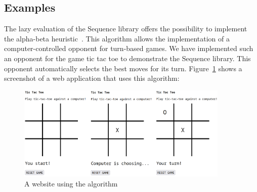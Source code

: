 \subsection*{Examples} %
\label{sub:introduction_Examples}
The lazy evaluation of the Sequence library offers the possibility to implement
the alpha-beta heuristic~\cite[Ch. 5]{hughes_why_1989}. 
This algorithm allows the implementation of a computer-controlled opponent for
turn-based games. We have implemented such an opponent for the game tic tac toe
to demonstrate the Sequence library. This opponent automatically selects the
best moves for its turn. Figure~\ref{img:intro_ttt_playfield} shows a screenshot of a web
application that uses this algorithm:
\begin{figure}[H]
    \centering
    \includegraphics[width=0.9\textwidth]{./mainmatter/pictures/tic-tac-toe-field.png}
    \caption{A website using the algorithm}
    \label{img:intro_ttt_playfield}
\end{figure}

